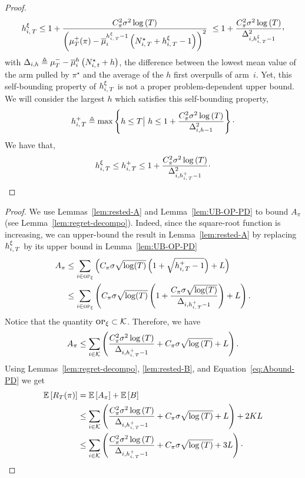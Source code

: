 \begin{proof}
\[
\hiT^\xi \leq 1 + \frac{C_\pi^2 \sigma^2\log\pa{T}}{\pa{\mu_T^+(\pi)- \bmu_i^{\hiT^\xi  - 1} \left( \NiT^\star + \hiT^\xi   - 1 \right) }^2 }\ \leq 1 + \frac{C_\pi^2 \sigma^2\log\pa{T}}{\Delta_{i,\hiT^\xi  - 1}^2}\CommaBin
\] 
with $\Delta_{i,h} \triangleq \mu^-_T- \overline{\mu}_i^h\left( N_{i,\,t}^\star+h \right)$, the difference between the lowest mean value of the arm pulled by $\pi^\star$ and the average of the $h$ first overpulls of arm~$i$. Yet, this self-bounding property of $h_{i,\,T}^\xi $ is not a proper problem-dependent upper bound. We will consider the largest $h$ which satisfies this self-bounding property, 
\begin{equation*}
 \hiT^+  \triangleq \max \left\{ h \leq T \big| \ h \leq  1 + \frac{C_\pi^2 \sigma^2 \log \pa{T}}{\Delta_{i,h-1}^2} \right\}\cdot
\end{equation*}
We have that,
\begin{equation*}
h_{i,\,T}^\xi \leq  h_{i,\,T}^+  \leq  1 + \frac{C_\pi^2 \sigma^2 \log \left(T\right)}{\Delta_{i,h_{i,\,T}^+-1}^2}\cdot
\end{equation*}
\end{proof}
\restaalgoub*
\begin{proof}
We use Lemmas~\ref{lem:rested-A} and Lemma~\ref{lem:UB-OP-PD} to bound $A_\pi$ (see Lemma~\ref{lem:regret-decompo}). Indeed, since the square-root function is increasing, we can upper-bound the result in Lemma~\ref{lem:rested-A} by replacing $h_{i,\,T}^\xi$ by its upper bound in Lemma~\ref{lem:UB-OP-PD}
\begin{align*}
A_{\pi} &\leq \sum_{i\in \textsc{op}_\xi} \left(C_\pi \sigma\sqrt{\log(T)} \left( 1 + \sqrt{h_{i,\,T}^+ - 1}\right) + L\right)\\
& \leq \sum_{i\in \textsc{op}_\xi} \left(C_\pi \sigma\sqrt{\log(T)} \left( 1 + \frac{C_\pi \sigma\sqrt{\log(T)}}{\Delta_{i,h_{i,\,T}^+-1}}\right) + L\right). 
\end{align*}
Notice that the quantity $\textsc{op}_\xi \subset \mathcal{K}$. Therefore, we have 
\begin{equation}
\label{eq:Abound-PD}
A_{\pi} \leq \sum_{i\in \mathcal{K}} \left(\frac{C_\pi^2\sigma^2\log\left(T\right)}{\Delta_{i,h_{i,\,T}^+-1}} + C_\pi \sigma \sqrt{\log\left(T\right)} +L \right). 
\end{equation}
Using Lemmas~\ref{lem:regret-decompo}, \ref{lem:rested-B}, and Equation~\ref{eq:Abound-PD} we get
\begin{align*}
\mathbb{E}\left[R_T(\pi)\right] &=\mathbb{E}\left[A_{\pi}\right] + \mathbb{E}\left[B\right] 
\\&
\leq \sum_{i\in \mathcal{K}} \left(\frac{C_\pi^2\sigma^2\log\left(T\right)}{\Delta_{i,h_{i,\,T}^+-1}} + C_\pi \sigma \sqrt{\log\left(T\right)} +L \right) + 2KL \\
&\leq \sum_{i\in \mathcal{K}} \left(\frac{C_\pi^2\sigma^2\log\left(T\right)}{\Delta_{i,h_{i,\,T}^+-1}} + C_\pi \sigma \sqrt{\log\left(T\right)} +3L \right) \cdot
\end{align*}
\end{proof}